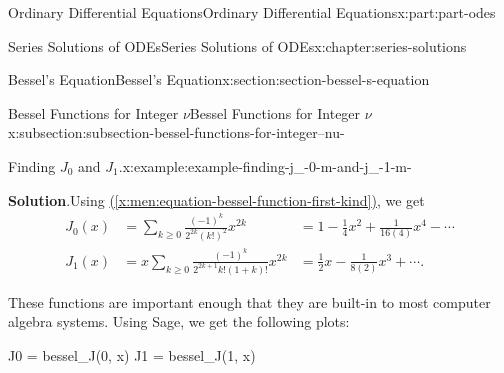 \documentclass[oneside,10pt,]{book}
\newcommand{\blocktitlefont}{\relax}
\newcommand{\xreffont}{\relax}
\numberwithin{equation}{part}
\newcommand{\amp}{&}
\begin{document}
\begin{partptx}{Ordinary Differential Equations}{}{Ordinary Differential Equations}{}{}{x:part:part-odes}
\begin{chapterptx}{Series Solutions of ODEs}{}{Series Solutions of ODEs}{}{}{x:chapter:series-solutions}
\begin{sectionptx}{Bessel's Equation}{}{Bessel's Equation}{}{}{x:section:section-bessel-s-equation}
\begin{subsectionptx}{Bessel Functions for Integer \(\nu\)}{}{Bessel Functions for Integer \(\nu\)}{}{}{x:subsection:subsection-bessel-functions-for-integer--nu-}
\begin{example}{Finding \(J_{0}\) and \(J_{1}\).}{x:example:example-finding-j_-0-m-and-j_-1-m-}
\par\smallskip%
\noindent\textbf{\blocktitlefont Solution}.\hypertarget{g:solution:idp105548781234208}{}\quad{}Using \hyperref[x:men:equation-bessel-function-first-kind]{({\xreffont\ref{x:men:equation-bessel-function-first-kind}})}, we get%
\begin{align*}
J_{0}(x) \amp = \sum_{k\geq0}\frac{(-1)^{k}}{2^{2k}(k!)^{2}}x^{2k} \amp= 1 - \frac{1}{4}x^{2} + \frac{1}{16(4)}x^{4} - \cdots\\
J_{1}(x) \amp = x\sum_{k\geq0}\frac{(-1)^{k}}{2^{2k + 1}k!(1 + k)!}x^{2k} \amp= \frac{1}{2}x - \frac{1}{8(2)}x^{3} + \cdots\text{.}
\end{align*}
%
\end{example}
These functions are important enough that they are built-in to most computer algebra systems. Using Sage, we get the following plots:%
\begin{sageinput}
J0 = bessel_J(0, x)
J1 = bessel_J(1, x)


\end{sageinput}
\end{subsectionptx}
\end{sectionptx}
\end{chapterptx}
\end{partptx}
\end{document}
